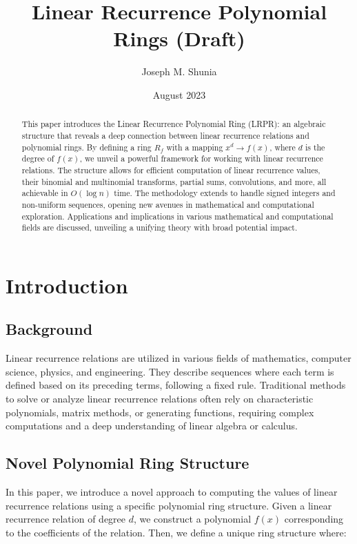 \documentclass{article}
\title{Linear Recurrence Polynomial Rings (Draft)}
\author{Joseph M. Shunia}
\date{August 2023}
\theoremstyle{plain}
\begin{document}
\maketitle

\begin{abstract}
This paper introduces the Linear Recurrence Polynomial Ring (LRPR): an algebraic structure that reveals a deep connection between linear recurrence relations and polynomial rings. By defining a ring \( R_f \) with a mapping \( x^d \rightarrow f(x) \), where \( d \) is the degree of \( f(x) \), we unveil a powerful framework for working with linear recurrence relations. The structure allows for efficient computation of linear recurrence values, their binomial and multinomial transforms, partial sums, convolutions, and more, all achievable in \( O(\log n) \) time. The methodology extends to handle signed integers and non-uniform sequences, opening new avenues in mathematical and computational exploration. Applications and implications in various mathematical and computational fields are discussed, unveiling a unifying theory with broad potential impact.
\end{abstract}

\section{Introduction}
\subsection{Background}

Linear recurrence relations are utilized in various fields of mathematics, computer science, physics, and engineering. They describe sequences where each term is defined based on its preceding terms, following a fixed rule. Traditional methods to solve or analyze linear recurrence relations often rely on characteristic polynomials, matrix methods, or generating functions, requiring complex computations and a deep understanding of linear algebra or calculus.

\subsection{Novel Polynomial Ring Structure}

In this paper, we introduce a novel approach to computing the values of linear recurrence relations using a specific polynomial ring structure. Given a linear recurrence relation of degree \( d \), we construct a polynomial \( f(x) \) corresponding to the coefficients of the relation. Then, we define a unique ring structure where:
\end{document}

